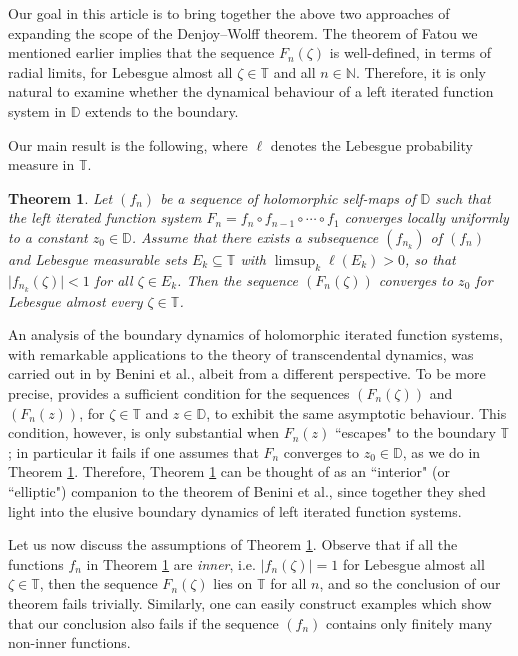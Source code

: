 \documentclass[11pt, reqno]{amsart}
\newtheorem{theorem}{Theorem}[section]
\theoremstyle{definition}
\numberwithin{equation}{section}
\newcommand{\N}{\mathbb{N}}
\newcommand{\D}{\mathbb{D}}
\newcommand{\T}{\mathbb{T}}
\begin{document}
Our goal in this article is to bring together the above two approaches of expanding the scope of the Denjoy--Wolff theorem. The theorem of Fatou we mentioned earlier implies that the sequence $F_n(\zeta)$ is well-defined, in terms of radial limits, for Lebesgue almost all $\zeta\in\T$ and all $n\in\N$. Therefore, it is only natural to examine whether the dynamical behaviour of a left iterated function system in $\D$ extends to the boundary. 

Our main result is the following, where $\ell$ denotes the Lebesgue probability measure in $\T$.

\begin{theorem}\label{mainprop}
Let $(f_n)$ be a sequence of holomorphic self-maps of $\D$ such that the left iterated function system $F_n=f_n\circ f_{n-1}\circ\cdots\circ f_1$ converges locally uniformly to a constant $z_0\in\D$. Assume that there exists a subsequence $(f_{n_k})$ of $(f_n)$ and Lebesgue measurable sets $E_k\subseteq\T$ with $\limsup_k \ell(E_k)>0$, so that $\lvert f_{n_k}(\zeta) \rvert<1$ for all $\zeta\in E_k$. Then the sequence $(F_n(\zeta))$ converges to $z_0$ for Lebesgue almost every $\zeta\in\T$.
\end{theorem}

An analysis of the boundary dynamics of holomorphic iterated function systems, with remarkable applications to the theory of transcendental dynamics, was carried out in \cite{BEFRS2} by Benini et al., albeit from a different perspective. To be more precise, \cite[Theorem B]{BEFRS2} provides a sufficient condition for the sequences $(F_n(\zeta))$ and $(F_n(z))$, for $\zeta\in\T$ and $z\in\D$, to exhibit the same asymptotic behaviour. This condition, however, is only substantial when $F_n(z)$ ``escapes" to the boundary $\T$; in particular it fails if one assumes that $F_n$ converges to $z_0\in\D$, as we do in Theorem \ref{mainprop}. Therefore, Theorem \ref{mainprop} can be thought of as an ``interior" (or ``elliptic") companion to the theorem of Benini et al., since together they shed light into the elusive boundary dynamics of left iterated function systems.

Let us now discuss the assumptions of Theorem \ref{mainprop}. Observe that if all the functions $f_n$ in Theorem \ref{mainprop} are \emph{inner}, i.e. $\lvert f_n(\zeta)\rvert =1$ for Lebesgue almost all $\zeta\in\T$, then the sequence $F_n(\zeta)$ lies on $\T$ for all $n$, and so the conclusion of our theorem fails trivially. Similarly, one can easily construct examples which show that our conclusion also fails if the sequence $(f_n)$ contains only finitely many non-inner functions. 
\end{document}
